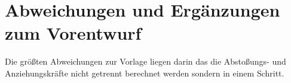 \chapter{Abweichungen und Erg\"anzungen zum Vorentwurf}
\label{Abweichungen}

Die größten Abweichungen zur Vorlage liegen darin das die Abstoßungs- und Anziehungskräfte nicht getrennt berechnet werden sondern in einem Schritt.